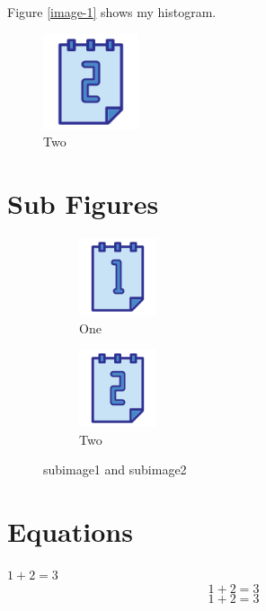 \documentclass[a4paper,12pt]{report}
\begin{document}
Figure \ref{image-1} shows my histogram.

\begin{figure}[h]
\centering
\includegraphics[width=0.25\textwidth]{2}
\caption{Two}
\end{figure}

\section{Sub Figures}

\begin{figure}[h!]
\begin{subfigure}{0.4\textwidth}
\centering
\includegraphics[width=0.25\textwidth]{1}
\caption{One}
\label{fig:subimage1}
\end{subfigure}
\begin{subfigure}{0.4\textwidth}
\centering
\includegraphics[width=0.25\textwidth]{2}
\caption{Two}
\label{fig:subimage2}
\end{subfigure}

\caption{subimage1 and subimage2}
\label{fig:image2}
\end{figure}

\section{Equations}
$1+2=3$
$$1+2=3$$	%
\begin{equation}
1+2=3
\end{equation}
\end{document}
